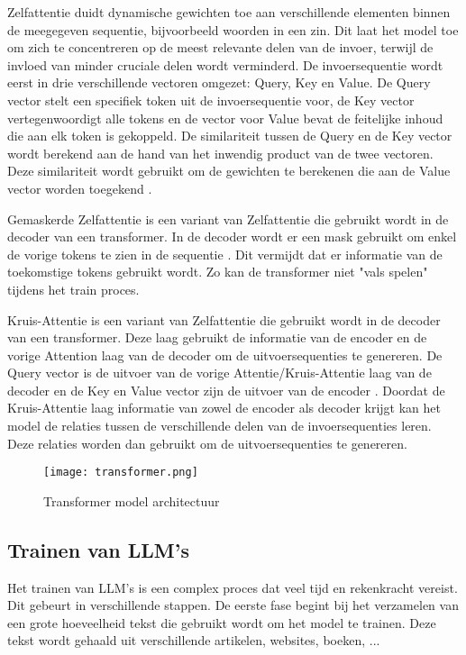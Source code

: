 Zelfattentie duidt dynamische gewichten toe aan verschillende elementen binnen de meegegeven sequentie, bijvoorbeeld woorden in een zin.
Dit laat het model toe om zich te concentreren op de meest relevante delen van de invoer, terwijl de invloed van minder cruciale delen wordt verminderd.
De invoersequentie wordt eerst in drie verschillende vectoren omgezet: Query, Key en Value.
De Query vector stelt een specifiek token uit de invoersequentie voor, de Key vector vertegenwoordigt alle tokens en de vector voor Value bevat de feitelijke inhoud die aan elk token is gekoppeld.
De similariteit tussen de Query en de Key vector wordt berekend aan de hand van het inwendig product van de twee vectoren.
Deze similariteit wordt gebruikt om de gewichten te berekenen die aan de Value vector worden toegekend \autocite{VaswaniEtAl2017}.

Gemaskerde Zelfattentie is een variant van Zelfattentie die gebruikt wordt in de decoder van een transformer.
In de decoder wordt er een mask gebruikt om enkel de vorige tokens te zien in de sequentie \autocite{VaswaniEtAl2017}.
Dit vermijdt dat er informatie van de toekomstige tokens gebruikt wordt. 
Zo kan de transformer niet "vals spelen" tijdens het train proces.

Kruis-Attentie is een variant van Zelfattentie die gebruikt wordt in de decoder van een transformer.
Deze laag gebruikt de informatie van de encoder en de vorige Attention laag van de decoder om de uitvoersequenties te genereren.
De Query vector is de uitvoer van de vorige Attentie/Kruis-Attentie laag van de decoder en de Key en Value vector zijn de uitvoer van de encoder \autocite{VaswaniEtAl2017}.
Doordat de Kruis-Attentie laag informatie van zowel de encoder als decoder krijgt kan het model de relaties tussen de verschillende delen van de invoersequenties leren.
Deze relaties worden dan gebruikt om de uitvoersequenties te genereren.

\begin{figure}[h]
  \centering
  \texttt{[image: transformer.png]}
  \caption[Architectuur transformer model]{Transformer model architectuur \autocite{VaswaniEtAl2017}}
  \label{fig:transformer-model}
\end{figure}

\subsection{Trainen van LLM's}
\label{sec:trainen-van-llms}
Het trainen van LLM's is een complex proces dat veel tijd en rekenkracht vereist. Dit gebeurt in verschillende stappen.
De eerste fase begint bij het verzamelen van een grote hoeveelheid tekst die gebruikt wordt om het model te trainen.
Deze tekst wordt gehaald uit verschillende artikelen, websites, boeken, ... 

